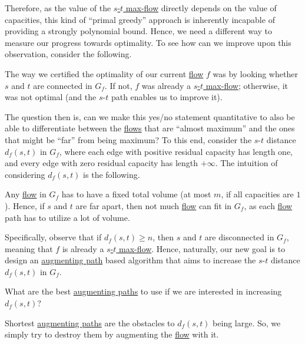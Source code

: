 Therefore, as the value of the \hyperref[prb:s-t-max-flow]{\(s\)-\(t\) max-flow} directly depends on the value of capacities, this kind of ``primal greedy'' approach is inherently incapable of providing a strongly polynomial bound. Hence, we need a different way to measure our progress towards optimality. To see how can we improve upon this observation, consider the following.

\begin{prev}
	The way we certified the optimality of our current \hyperref[def:flow]{flow} \(f\) was by looking whether \(s\) and \(t\) are connected in \(G_f\). If not, \(f\) was already a \hyperref[prb:s-t-max-flow]{\(s\)-\(t\) max-flow}; otherwise, it was not optimal (and the \(s\)-\(t\) path enables us to improve it).
\end{prev}

The question then is, can we make this yes/no statement quantitative to also be able to differentiate between the \hyperref[def:flow]{flows} that are ``almost maximum'' and the ones that might be ``far'' from being maximum? To this end, consider the \(s\)-\(t\) distance \(d_f(s, t)\) in \(G_f\), where each edge with positive residual capacity has length one, and every edge with zero residual capacity has length \(+\infty \). The intuition of considering \(d_f(s, t)\) is the following.

\begin{intuition}
	Any \hyperref[def:flow]{flow} in \(G_f\) has to have a fixed total volume (at most \(m\), if all capacities are \(1\)). Hence, if \(s\) and \(t\) are far apart, then not much \hyperref[def:flow]{flow} can fit in \(G_f\), as each \hyperref[def:flow]{flow} path has to utilize a lot of volume.
\end{intuition}

Specifically, observe that if \(d_f(s, t) \geq n\), then \(s\) and \(t\) are disconnected in \(G_f\), meaning that \(f\) is already a \hyperref[prb:s-t-max-flow]{\(s\)-\(t\) max-flow}. Hence, naturally, our new goal is to design an \hyperref[def:augmenting-path]{augmenting path} based algorithm that aims to increase the \(s\)-\(t\) distance \(d_f(s, t)\) in \(G_f\).

\begin{problem*}
	What are the best \hyperref[def:augmenting-path]{augmenting paths} to use if we are interested in increasing \(d_f(s, t)\)?
\end{problem*}
\begin{answer}
	Shortest \hyperref[def:augmenting-path]{augmenting paths} are the obstacles to \(d_f(s, t)\) being large. So, we simply try to destroy them by augmenting the \hyperref[def:flow]{flow} with it.
\end{answer}


